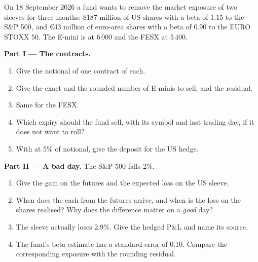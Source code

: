 \begin{problem}\label{pb:m1:futures-contracts-and-exchanges:1}
On 18 September 2026 a fund wants to remove the market exposure of two
sleeves for three months: \$187 million of US shares with a beta of 1.15 to
the S\&P 500, and \euro43 million of euro-area shares with a beta of 0.90 to
the EURO STOXX 50. The E-mini is at 6\,000 and the FESX at 5\,400.

\medskip\noindent\textbf{Part I --- The contracts.}
\begin{enumerate}
\item Give the notional of one contract of each.
\item Give the exact and the rounded number of E-minis to sell, and the
residual.
\item Same for the FESX.
\item Which expiry should the fund sell, with its symbol and last trading
day, if it does not want to roll?
\item With  at 5\% of notional, give the deposit for the US
hedge.
\end{enumerate}

\medskip\noindent\textbf{Part II --- A bad day.}
The S\&P 500 falls 2\%.
\begin{enumerate}[resume]
\item Give the gain on the futures and the expected loss on the US sleeve.
\item When does the cash from the futures arrive, and when is the loss on
the shares realised? Why does the difference matter on a \emph{good} day?
\item The sleeve actually loses 2.9\%. Give the hedged P\&L and name its
source.
\item The fund's beta estimate has a standard error of 0.10. Compare the
corresponding exposure with the rounding residual.
\end{enumerate}


\end{problem}
